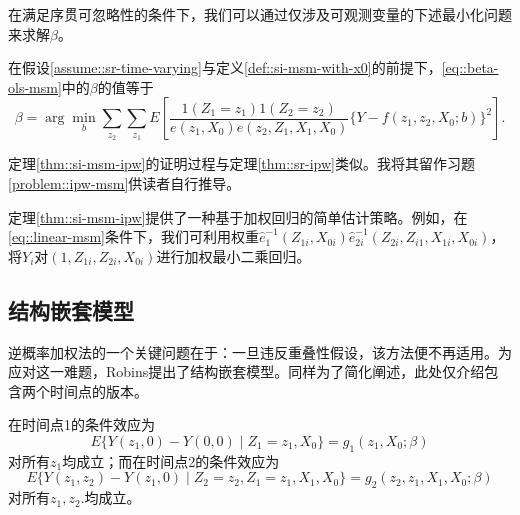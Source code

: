 在满足序贯可忽略性的条件下，我们可以通过仅涉及可观测变量的下述最小化问题来求解$\beta$。


\begin{theorem}
[在边际结构模型下采用逆概率加权法]
\label{thm::si-msm-ipw}
在假设\ref{assume::sr-time-varying}与定义\ref{def::si-msm-with-x0}的前提下，\eqref{eq::beta-ols-msm}中的$\beta$的值等于
$$
\beta = \arg\min_b \sum_{z_2}\sum_{z_1}  E\left[   \frac{  1(Z_1=z_1) 1(Z_2=z_2)   }{   e(z_1, X_0) e(z_2, Z_1, X_1, X_0)     }      
\{ Y -  f(z_1,z_2, X_0; b)  \}^2 \right] .
$$
\end{theorem}

定理\ref{thm::si-msm-ipw}的证明过程与定理\ref{thm::sr-ipw}类似。我将其留作习题\ref{problem::ipw-msm}供读者自行推导。


 定理\ref{thm::si-msm-ipw}提供了一种基于加权回归的简单估计策略。例如，在\eqref{eq::linear-msm}条件下，我们可利用权重$\hat{e}_{1}^{-1}(Z_{1i}, X_{0i})  \hat{e}_{2i}^{-1}(Z_{2i}, Z_{i1}, X_{1i}, X_{0i})$，将$Y_i$对$(1,Z_{1i}, Z_{2i}, X_{0i})$进行加权最小二乘回归。

 



\subsection{结构嵌套模型}



逆概率加权法的一个关键问题在于：一旦违反重叠性假设，该方法便不再适用。为应对这一难题，Robins提出了结构嵌套模型。同样为了简化阐述，此处仅介绍包含两个时间点的版本。

\begin{definition}
[结构嵌套模型]
\label{def::snm}
在时间点1的条件效应为
$$
E\{  Y(z_1,0) - Y(0,0) \mid  Z_1=z_1,  X_0 \} = g_1( z_1, X_0; \beta)   
$$
对所有$z_1$均成立；而在时间点2的条件效应为
$$
E\{  Y(z_1,z_2) - Y(z_1,0) \mid Z_2=z_2,Z_1=z_1,  X_1,  X_0 \} = g_2(z_2, z_1,  X_1,  X_0; \beta)
$$
对所有$ z_1, z_2.$均成立。
\end{definition}




